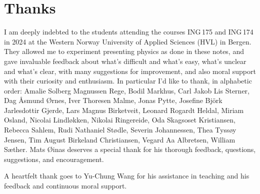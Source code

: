 \documentclass[a4paper,12pt,%
onecolumn,oneside,%
british%
]{memoir}
\newcommand{\addsec}[1]{\section*{#1}\addcontentsline{toc}{section}{#1}}
\renewcommand*{\|}[1][]{\nonscript\:#1\vert\nonscript\:\mathopen{}}
\begin{document}
\iftrue
\addsec{Thanks}
\label{sec:thanks}

I am deeply indebted to the students attending the courses ING\,175 and ING\,174 in 2024 at the Western Norway University of Applied Sciences (HVL) in Bergen. They allowed me to experiment presenting physics as done in these notes, and gave invaluable feedback about what's difficult and what's easy, what's unclear and what's clear, with many suggestions for improvement, and also moral support with their curiosity and enthusiasm. In particular I'd like to thank, in alphabetic order: %
Amalie Solberg Magnussen Rege, %
Bodil Markhus, %
Carl Jakob Lis Sterner, %
Dag Åsmund Ørnes, %
Iver Thoresen Malme, %
Jonas Pytte, %
Josefine Björk Jarlesdottir Gjerde, %
Lars Magnus Birketveit, %
Leonard Rogardt Heldal, %
Miriam Osland, %
Nicolai Lindløkken, %
Nikolai Ringereide, %
Oda Skagsoset Kristiansen, %
Rebecca Sahlem, %
Rudi Nathaniel Stødle, %
Severin Johannessen, %
Thea Tyssøy Jensen, %
Tim August Birkeland Christiansen, %
Vegard Aa Albretsen, %
William Sæther. %
Mats Øinas deserves a special thank for his thorough feedback, questions, suggestions, and encouragement.

A heartfelt thank goes to Yu-Chung Wang for his assistance in teaching and his feedback and continuous moral support.
\fi
\end{document}
